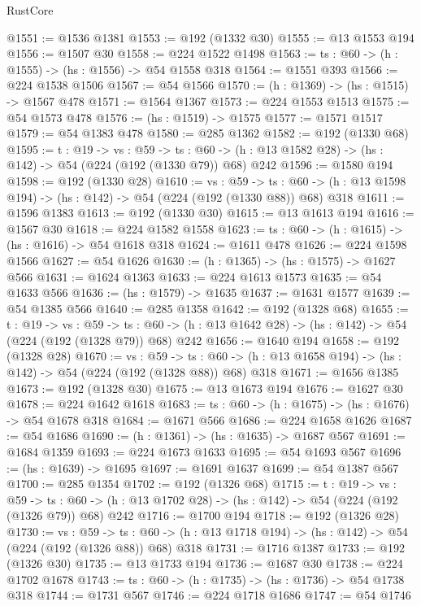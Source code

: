 \begin{lexlean}{RustCore}
\begin{coremodule}
@1551 := @1536 @1381
@1553 := @192 (@1332 @30)
@1555 := @13 @1553 @194
@1556 := @1507 @30
@1558 := @224 @1522 @1498
@1563 := {ts : @60} -> (h : @1555) -> (hs : @1556) -> @54 @1558 @318
@1564 := @1551 @393
@1566 := @224 @1538 @1506
@1567 := @54 @1566
@1570 := (h : @1369) -> (hs : @1515) -> @1567 @478
@1571 := @1564 @1367
@1573 := @224 @1553 @1513
@1575 := @54 @1573 @478
@1576 := (hs : @1519) -> @1575
@1577 := @1571 @1517
@1579 := @54 @1383 @478
@1580 := @285 @1362
@1582 := @192 (@1330 @68)
@1595 := {t : @19} ->
  {vs : @59} ->
  {ts : @60} -> (h : @13 @1582 @28) -> (hs : @142) -> @54 (@224 (@192 (@1330 @79)) @68) @242
@1596 := @1580 @194
@1598 := @192 (@1330 @28)
@1610 := {vs : @59} ->
  {ts : @60} -> (h : @13 @1598 @194) -> (hs : @142) -> @54 (@224 (@192 (@1330 @88)) @68) @318
@1611 := @1596 @1383
@1613 := @192 (@1330 @30)
@1615 := @13 @1613 @194
@1616 := @1567 @30
@1618 := @224 @1582 @1558
@1623 := {ts : @60} -> (h : @1615) -> (hs : @1616) -> @54 @1618 @318
@1624 := @1611 @478
@1626 := @224 @1598 @1566
@1627 := @54 @1626
@1630 := (h : @1365) -> (hs : @1575) -> @1627 @566
@1631 := @1624 @1363
@1633 := @224 @1613 @1573
@1635 := @54 @1633 @566
@1636 := (hs : @1579) -> @1635
@1637 := @1631 @1577
@1639 := @54 @1385 @566
@1640 := @285 @1358
@1642 := @192 (@1328 @68)
@1655 := {t : @19} ->
  {vs : @59} ->
  {ts : @60} -> (h : @13 @1642 @28) -> (hs : @142) -> @54 (@224 (@192 (@1328 @79)) @68) @242
@1656 := @1640 @194
@1658 := @192 (@1328 @28)
@1670 := {vs : @59} ->
  {ts : @60} -> (h : @13 @1658 @194) -> (hs : @142) -> @54 (@224 (@192 (@1328 @88)) @68) @318
@1671 := @1656 @1385
@1673 := @192 (@1328 @30)
@1675 := @13 @1673 @194
@1676 := @1627 @30
@1678 := @224 @1642 @1618
@1683 := {ts : @60} -> (h : @1675) -> (hs : @1676) -> @54 @1678 @318
@1684 := @1671 @566
@1686 := @224 @1658 @1626
@1687 := @54 @1686
@1690 := (h : @1361) -> (hs : @1635) -> @1687 @567
@1691 := @1684 @1359
@1693 := @224 @1673 @1633
@1695 := @54 @1693 @567
@1696 := (hs : @1639) -> @1695
@1697 := @1691 @1637
@1699 := @54 @1387 @567
@1700 := @285 @1354
@1702 := @192 (@1326 @68)
@1715 := {t : @19} ->
  {vs : @59} ->
  {ts : @60} -> (h : @13 @1702 @28) -> (hs : @142) -> @54 (@224 (@192 (@1326 @79)) @68) @242
@1716 := @1700 @194
@1718 := @192 (@1326 @28)
@1730 := {vs : @59} ->
  {ts : @60} -> (h : @13 @1718 @194) -> (hs : @142) -> @54 (@224 (@192 (@1326 @88)) @68) @318
@1731 := @1716 @1387
@1733 := @192 (@1326 @30)
@1735 := @13 @1733 @194
@1736 := @1687 @30
@1738 := @224 @1702 @1678
@1743 := {ts : @60} -> (h : @1735) -> (hs : @1736) -> @54 @1738 @318
@1744 := @1731 @567
@1746 := @224 @1718 @1686
@1747 := @54 @1746

\end{coremodule}
\end{lexlean}
